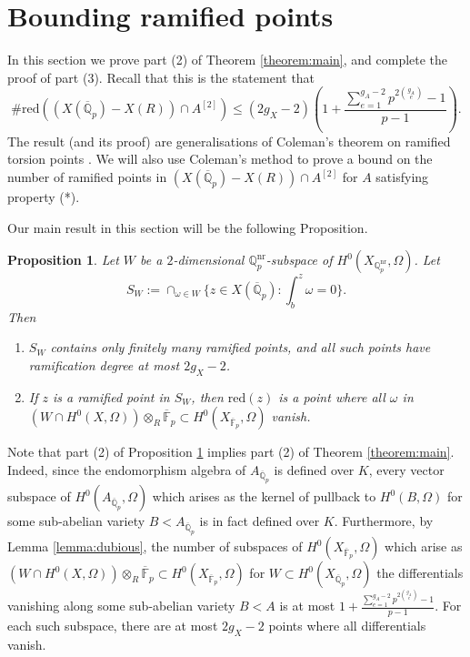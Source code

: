 \documentclass[11pt]{amsart}
\def\Q{\mathbb Q}
\theoremstyle{plain}
\newtheorem{lemma}{Lemma}
\newtheorem{proposition}{Proposition}
\theoremstyle{definition}
\newcommand{\F}{\mathbb{F}}
\newcommand{\red}{\mathrm{red}}
\begin{document}
\section{Bounding ramified points}\label{sec:ram}
In this section we prove part (2) of Theorem \ref{theorem:main}, and complete the proof of part (3). Recall that this is the statement that 
\[
\# \red ((X(\overline{\Q }_p )-X(R))\cap A^{[2]}) \leq (2g_X -2)\left(1+\frac{\sum _{e=1}^{g_A -2}p^{2\binom{g_A }{e}}-1}{p-1}\right).
\]
The result (and its proof) are generalisations of Coleman's theorem on ramified torsion points \cite{coleman:ramified}. We will also use Coleman's method to prove a bound on the number of ramified points in $(X(\overline{\Q }_p )-X(R))\cap A^{[2]}$ for $A$ satisfying property (*). 
%

Our main result in this section will be the following Proposition.
\begin{proposition}\label{prop:coleman1}
Let $W$ be a $2$-dimensional $\Q _p ^{\mathrm{nr}}$-subspace of $H^0 (X_{\Q _p ^{\mathrm{nr}}},\Omega )$. Let 
\[
S_W :=\cap _{\omega \in W} \{ z\in X(\overline{\Q }_p ):\int ^z _b \omega =0 \} .
\]
Then
\begin{enumerate}
\item 
$S_W$ contains only finitely many ramified points, and all such points have ramification degree at most $2g_X -2$. 
\item If $z$ is a ramified point in $S_W $, then $\red (z)$ is a point where all $\omega $ in $(W\cap H^0 (X,\Omega ))\otimes _R \overline{\F }_p \subset H^0 (X_{\overline{\F }_p },\Omega )$ vanish. 
\end{enumerate}
\end{proposition}
Note that part (2) of Proposition \ref{prop:coleman1} implies part (2) of Theorem \ref{theorem:main}. Indeed, since the endomorphism algebra of $A_{\overline{\Q }_p}$ is defined over $K$, every vector subspace of $H^0 (A_{\overline{\Q }_p },\Omega )$ which arises as the kernel of pullback to $H^0 (B,\Omega )$ for some sub-abelian variety $B<A_{\overline{\Q }_p }$ is in fact defined over $K$. Furthermore, by Lemma \ref{lemma:dubious}, the number of subspaces of $H^0 (X_{\overline{\F }_p }, \Omega )$ which arise as $(W\cap H^0 (X,\Omega ))\otimes _R \overline{\F }_p \subset H^0 (X_{\overline{\F }_p },\Omega )$ for $W\subset H^0 (X_{\overline{\Q }_p },\Omega )$ the differentials vanishing along some sub-abelian variety $B<A$ is at most $1+\frac{\sum _{e=1}^{g_A -2}p^{2\binom{g_A }{e}}-1}{p-1}$. For each such subspace, there are at most $2g_X -2$ points where all differentials vanish.
\end{document}
